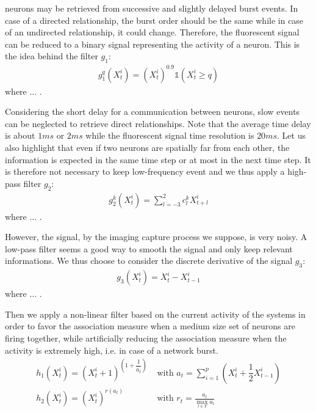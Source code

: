 \documentclass[wcp]{jmlr}
\begin{document}

neurons may be retrieved from successive and slightly delayed burst events. In
case of a directed relationship, the burst order should be the same while in
case of an undirected relationship, it could change. Therefore, the
fluorescent signal can be reduced to a binary signal representing the activity
of a neuron. This is the idea behind the filter $g_1$:  \begin{align}
g_1^q(X^i_t) = (X^i_t)^{0.9} \mathbb{1}(X^i_t \ge q) \end{align} where ... .

Considering the short delay for a communication between neurons, slow events
can be neglected to retrieve direct relationships. Note that the average time
delay is about $1ms$ or $2ms$ while the fluorescent signal time resolution is
$20ms$. Let us also highlight that even if two neurons are spatially far from
each other, the information is expected in the same time step or at most in
the next time step. It is therefore not necessary to keep low-frequency event
and we thus apply a high-pass filter $g_2$: \begin{align} g_2^k(X^i_t) =
\sum_{l=-3}^{2} c^k_l X^i_{t+l}  \end{align} where ... .

However, the signal, by the imaging capture process we suppose, is very noisy.
A low-pass filter seems a good way to smooth the signal and only keep relevant
informations. We thus choose to consider the discrete derivative of the signal
$g_3$: \begin{align} g_3(X_t^i) = X^i_t - X^i_{t-1} \end{align} where ... .


Then we apply a non-linear filter based on the current activity of the systems
in order to favor the association measure when a medium size set of neurons
are firing together, while artificially reducing the association measure when
the activity is extremely high, i.e. in case of a network burst. \begin{align}
h_1(X_t^i) = (X_t^i + 1)^{\left( 1 + \dfrac{1}{a_t} \right)} &\text{ with }
a_t = \sum_{i=1}^p \left ( X_t^i + \dfrac{1}{2} X_{t-1}^i \right ) \\
h_2(X_t^i) = (X_t^i)^{r(a_t)} &\text{ with } r_t = \frac{a_t}{\max_{l \in
T}{a_l}}  \end{align}
\end{document}
